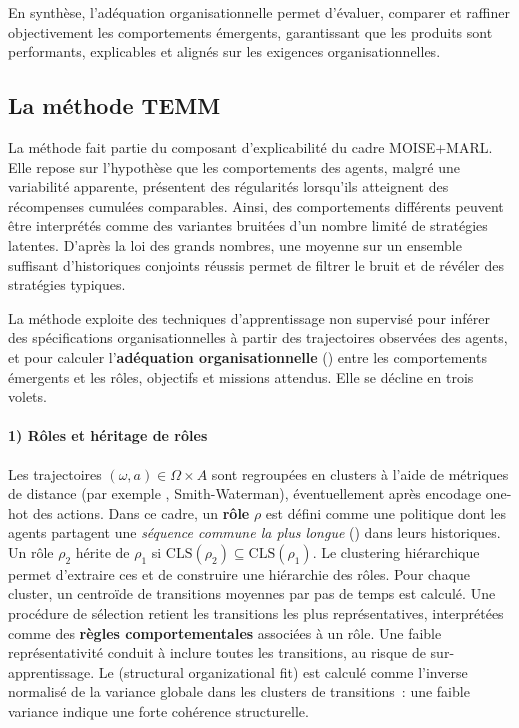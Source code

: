 En synthèse, l’adéquation organisationnelle permet d’évaluer, comparer et raffiner objectivement les comportements émergents, garantissant que les  produits sont performants, explicables et alignés sur les exigences organisationnelles.

\subsection{La méthode TEMM}
\label{sec:TEMM_algorithm}

La méthode  fait partie du composant d'explicabilité du cadre MOISE+MARL. Elle repose sur l’hypothèse que les comportements des agents, malgré une variabilité apparente, présentent des régularités lorsqu'ils atteignent des récompenses cumulées comparables. Ainsi, des comportements différents peuvent être interprétés comme des variantes bruitées d'un nombre limité de stratégies latentes. D’après la loi des grands nombres, une moyenne sur un ensemble suffisant d’historiques conjoints réussis permet de filtrer le bruit et de révéler des stratégies typiques.

La méthode exploite des techniques d’apprentissage non supervisé pour inférer des spécifications organisationnelles à partir des trajectoires observées des agents, et pour calculer l’\textbf{adéquation organisationnelle} () entre les comportements émergents et les rôles, objectifs et missions attendus. Elle se décline en trois volets.

\paragraph{1) Rôles et héritage de rôles}
Les trajectoires $(\omega, a) \in \Omega \times A$ sont regroupées en clusters à l’aide de métriques de distance (par exemple , Smith-Waterman), éventuellement après encodage one-hot des actions.
Dans ce cadre, un \textbf{rôle} $\rho$ est défini comme une politique dont les agents partagent une \textit{séquence commune la plus longue} () dans leurs historiques.
Un rôle $\rho_2$ hérite de $\rho_1$ si $\text{CLS}(\rho_2) \subseteq \text{CLS}(\rho_1)$.
Le clustering hiérarchique permet d’extraire ces  et de construire une hiérarchie des rôles.
Pour chaque cluster, un centroïde de transitions moyennes par pas de temps est calculé. Une procédure de sélection retient les transitions les plus représentatives, interprétées comme des \textbf{règles comportementales} associées à un rôle.
Une faible représentativité conduit à inclure toutes les transitions, au risque de sur-apprentissage.
Le \textbf{} (structural organizational fit) est calculé comme l’inverse normalisé de la variance globale dans les clusters de transitions~: une faible variance indique une forte cohérence structurelle.

